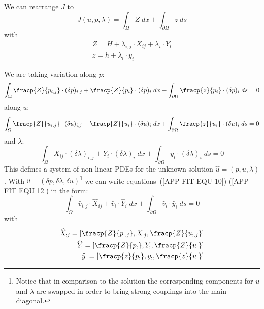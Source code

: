 We can rearrange $J$ to 
\begin{equation}\label{APP FIT EQU 5}
J(u,p,\lambda) = \int_{\Omega} Z \; dx 
+  \int_{\partial \Omega} z \; ds
\end{equation}
with 
\begin{align}\label{APP FIT EQU 6}
 Z =  H+ \lambda_{i,j} \cdot X_{ij} +  \lambda_{i} \cdot Y_{i} \\
z= h  + \lambda_{i} \cdot y_{i} 
\end{align}

We are taking variation along $p$:
\begin{equation}\label{APP FIT EQU 10}
\int_{\Omega} \fracp{Z}{p_{i,j}}  \cdot  (\delta p)_{i,j} + \fracp{Z}{p_{i}} \cdot  (\delta p)_{i}
\; dx +  \int_{\partial \Omega} \fracp{z}{p_{i}}  \cdot  (\delta p)_{i} \; ds =0
\end{equation}
along $u$:
\begin{align}\label{APP FIT EQU 11}
\int_{\Omega} \fracp{Z}{u_{i,j}}  \cdot (\delta u)_{i,j} + \fracp{Z}{u_{i}} \cdot  (\delta u)_{i}
\; dx +  \int_{\partial \Omega} \fracp{z}{u_{i}}  \cdot  (\delta u)_{i} \; ds =0
\end{align}
and $\lambda$:
\begin{equation}\label{APP FIT EQU 12}
\int_{\Omega} X_{ij}  \cdot (\delta \lambda)_{i,j}  +  Y_{i}  \cdot (\delta \lambda)_{i}  \; dx
+ \int_{\partial \Omega}   y_{i}  \cdot  (\delta \lambda)_{i}  \; ds = 0
\end{equation}
This defines a system of non-linear PDEs for the unknown solution $\widehat{u} = (p,u,\lambda)$. With 
$\widehat{v} = (\delta p,\delta \lambda, \delta u)$\footnote{Notice that in comparison to the solution
the corresponding components for $u$ and $\lambda$ are swapped in order to bring strong couplings into the main-diagonal.}
we can write equations~(\ref{APP FIT EQU 10})-(\ref{APP FIT EQU 12}) in the form:
\begin{equation} \label{APP FIT EQU 13}
\int_{\Omega} \widehat{v}_{i,j} \cdot \widehat{X}_{ij} + \widehat{v}_{i} \cdot \widehat{Y}_{i} \; dx
+ \int_{\partial \Omega}  \widehat{v}_{i} \cdot \widehat{y}_{i} \; ds  = 0 
\end{equation}
with
\begin{align}\label{APP FIT EQU 15}
\widehat{X}_{:j} = \left[ \fracp{Z}{p_{:,j}}, X_{:j}, \fracp{Z}{u_{:,j}} \right] \\
\widehat{Y}_{:} = \left[ \fracp{Z}{p_{:}}, Y_{:}, \fracp{Z}{u_{:}} \right] \\
\widehat{y}_{:} = \left[ \fracp{z}{p_{:}}, y_{:}, \fracp{z}{u_{:}} \right] 
\end{align}

